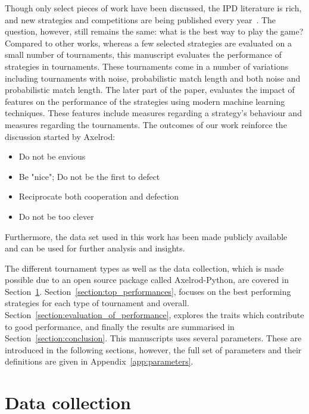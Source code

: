 \documentclass{article}
\newcommand{\numberofalltournaments}{}
\newcommand{\numberofstrategies}{}
\begin{document}
Though only select pieces of work have been discussed, the IPD literature is
rich, and new strategies and competitions are being published every year~\cite{Glynatsi2019}. The
question, however, still remains the same: what is the best way to play the
game? Compared to other works, whereas a few selected strategies are evaluated
on a small number of tournaments, this manuscript evaluates the performance of \numberofstrategies
strategies in \numberofalltournaments tournaments. These tournaments come in a
number of variations including tournaments with noise, probabilistic match
length and both noise and probabilistic match length.
The later part of the paper, evaluates
the impact of features on the performance of the strategies using modern
machine learning techniques. These features include measures regarding a
strategy's behaviour and measures regarding the tournaments. The outcomes of our
work reinforce the discussion started by Axelrod:

\begin{itemize}
    \item Do not be envious
    \item Be "nice"; Do not be the first to defect
    \item Reciprocate both cooperation and defection
    \item Do not be too clever
\end{itemize}

Furthermore, the data set used
in this work has been made publicly available~\cite{data} and can be used
for further analysis and insights.

The different tournament types as well as the data collection, which is made
possible due to an open source package called Axelrod-Python,
are covered in Section~\ref{section:data_collection}.
Section~\ref{section:top_performances}, focuses on the best performing
strategies for each type of tournament and overall.
Section~\ref{section:evaluation_of_performance}, explores the traits which
contribute to good performance, and finally the results are summarised in
Section~\ref{section:conclusion}. This manuscripts uses several parameters.
These are introduced in the following sections, however, the full set of
parameters and their definitions are given in Appendix~\ref{app:parameters}.

\section{Data collection}\label{section:data_collection}
\end{document}
